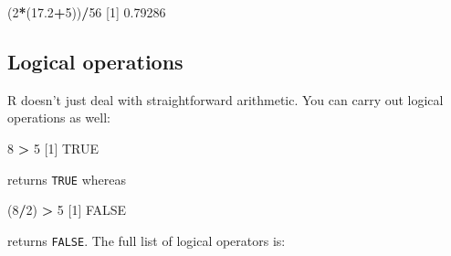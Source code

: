 \documentclass[
]{book}
\newenvironment{Shaded}{\begin{snugshade}}{\end{snugshade}}
\newcommand{\DecValTok}[1]{\textcolor[rgb]{0.00,0.00,0.81}{#1}}
\newcommand{\FloatTok}[1]{\textcolor[rgb]{0.00,0.00,0.81}{#1}}
\newcommand{\NormalTok}[1]{#1}
\newcommand{\OperatorTok}[1]{\textcolor[rgb]{0.81,0.36,0.00}{\textbf{#1}}}
\newcommand{\OtherTok}[1]{\textcolor[rgb]{0.56,0.35,0.01}{#1}}
\newcommand{\StringTok}[1]{\textcolor[rgb]{0.31,0.60,0.02}{#1}}
\begin{document}
\begin{Shaded}
\begin{Highlighting}[]
\NormalTok{(}\DecValTok{2}\OperatorTok{*}\NormalTok{(}\FloatTok{17.2}\OperatorTok{+}\DecValTok{5}\NormalTok{))}\OperatorTok{/}\DecValTok{56}
\NormalTok{[}\DecValTok{1}\NormalTok{] }\FloatTok{0.79286}
\end{Highlighting}
\end{Shaded}

\hypertarget{logical-operations}{%
\subsection{Logical operations}\label{logical-operations}}

R doesn't just deal with straightforward arithmetic. You can carry out logical operations as well:

\begin{Shaded}
\begin{Highlighting}[]
\DecValTok{8} \OperatorTok{>}\StringTok{ }\DecValTok{5}
\NormalTok{[}\DecValTok{1}\NormalTok{] }\OtherTok{TRUE}
\end{Highlighting}
\end{Shaded}

returns \texttt{TRUE} whereas

\begin{Shaded}
\begin{Highlighting}[]
\NormalTok{(}\DecValTok{8}\OperatorTok{/}\DecValTok{2}\NormalTok{) }\OperatorTok{>}\StringTok{ }\DecValTok{5}
\NormalTok{[}\DecValTok{1}\NormalTok{] }\OtherTok{FALSE}
\end{Highlighting}
\end{Shaded}

returns \texttt{FALSE}. The full list of logical operators is:
\end{document}
